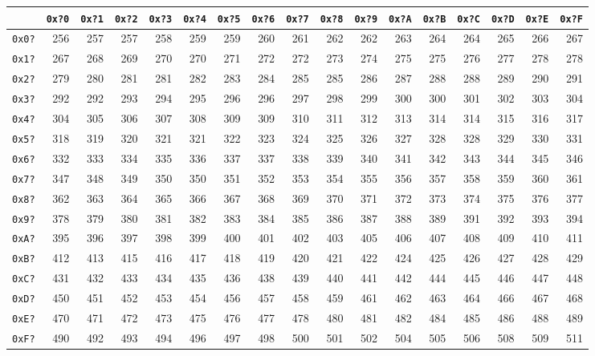 {\ttfamily
\begin{tabular}{|r|r|r|r|r|r|r|r|r|r|r|r|r|r|r|r|r|}
\hline
& \texttt{0x?0} & \texttt{0x?1} & \texttt{0x?2} & \texttt{0x?3} & \texttt{0x?4} & \texttt{0x?5} & \texttt{0x?6} & \texttt{0x?7} & \texttt{0x?8} & \texttt{0x?9} & \texttt{0x?A} & \texttt{0x?B} & \texttt{0x?C} & \texttt{0x?D} & \texttt{0x?E} & \texttt{0x?F} \\
\hline
\texttt{0x0?} & 256 & 257 & 257 & 258 & 259 & 259 & 260 & 261 & 262 & 262 & 263 & 264 & 264 & 265 & 266 & 267 \\
\texttt{0x1?} & 267 & 268 & 269 & 270 & 270 & 271 & 272 & 272 & 273 & 274 & 275 & 275 & 276 & 277 & 278 & 278 \\
\texttt{0x2?} & 279 & 280 & 281 & 281 & 282 & 283 & 284 & 285 & 285 & 286 & 287 & 288 & 288 & 289 & 290 & 291 \\
\texttt{0x3?} & 292 & 292 & 293 & 294 & 295 & 296 & 296 & 297 & 298 & 299 & 300 & 300 & 301 & 302 & 303 & 304 \\
\texttt{0x4?} & 304 & 305 & 306 & 307 & 308 & 309 & 309 & 310 & 311 & 312 & 313 & 314 & 314 & 315 & 316 & 317 \\
\texttt{0x5?} & 318 & 319 & 320 & 321 & 321 & 322 & 323 & 324 & 325 & 326 & 327 & 328 & 328 & 329 & 330 & 331 \\
\texttt{0x6?} & 332 & 333 & 334 & 335 & 336 & 337 & 337 & 338 & 339 & 340 & 341 & 342 & 343 & 344 & 345 & 346 \\
\texttt{0x7?} & 347 & 348 & 349 & 350 & 350 & 351 & 352 & 353 & 354 & 355 & 356 & 357 & 358 & 359 & 360 & 361 \\
\texttt{0x8?} & 362 & 363 & 364 & 365 & 366 & 367 & 368 & 369 & 370 & 371 & 372 & 373 & 374 & 375 & 376 & 377 \\
\texttt{0x9?} & 378 & 379 & 380 & 381 & 382 & 383 & 384 & 385 & 386 & 387 & 388 & 389 & 391 & 392 & 393 & 394 \\
\texttt{0xA?} & 395 & 396 & 397 & 398 & 399 & 400 & 401 & 402 & 403 & 405 & 406 & 407 & 408 & 409 & 410 & 411 \\
\texttt{0xB?} & 412 & 413 & 415 & 416 & 417 & 418 & 419 & 420 & 421 & 422 & 424 & 425 & 426 & 427 & 428 & 429 \\
\texttt{0xC?} & 431 & 432 & 433 & 434 & 435 & 436 & 438 & 439 & 440 & 441 & 442 & 444 & 445 & 446 & 447 & 448 \\
\texttt{0xD?} & 450 & 451 & 452 & 453 & 454 & 456 & 457 & 458 & 459 & 461 & 462 & 463 & 464 & 466 & 467 & 468 \\
\texttt{0xE?} & 470 & 471 & 472 & 473 & 475 & 476 & 477 & 478 & 480 & 481 & 482 & 484 & 485 & 486 & 488 & 489 \\
\texttt{0xF?} & 490 & 492 & 493 & 494 & 496 & 497 & 498 & 500 & 501 & 502 & 504 & 505 & 506 & 508 & 509 & 511 \\
\hline
\end{tabular}
}


